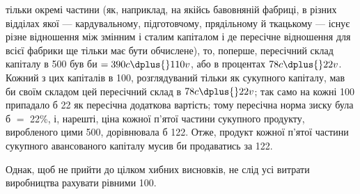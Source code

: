 \parcont{}  %
тільки окремі частини (як, наприклад, на якійсь бавовняній фабриці, в різних відділах якої —
кардувальному, підготовчому, прядільному й ткацькому — існує різне відношення між змінним і
сталим капіталом і де пересічне відношення для всієї фабрики
ще тільки має бути обчислене), то, поперше, пересічний склад
капіталу в 500 був би $= 390 c \dplus{} 110 v$, або в процентах $78 c \dplus{} 22 v$.
Кожний з цих капіталів в 100, розглядуваний тільки як  сукупного капіталу, мав би своїм складом цей
пересічний склад
в $78 c \dplus{} 22 v$; так само на кожні 100 припадало б 22 як пересічна
додаткова вартість; тому пересічна норма зиску була б $=$ 22\%,
і, нарешті, ціна кожної п’ятої частини сукупного продукту, виробленого цими 500, дорівнювала б 122.
Отже, продукт кожної
п’ятої частини сукупного авансованого капіталу мусив би продаватись за 122.

Однак, щоб не прийти до цілком хибних висновків, не слід
усі витрати виробництва рахувати рівними 100.

